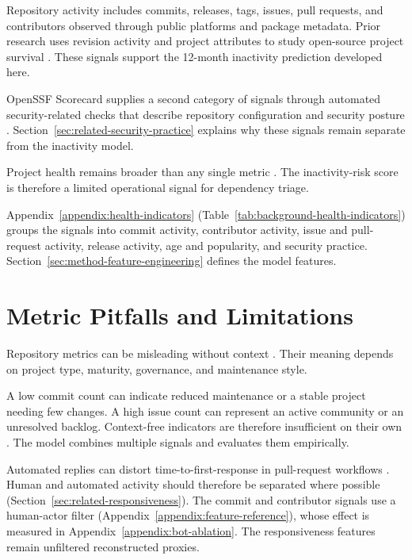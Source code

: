 Repository activity includes commits, releases, tags, issues, pull requests, and
contributors observed through public platforms and package metadata. Prior
research uses revision activity and project attributes to study open-source
project survival \cite{robinson2022survival}. These signals support the 12-month
inactivity prediction developed here.

OpenSSF Scorecard supplies a second category of signals through automated
security-related checks that describe repository configuration and security
posture \cite{zahan2023scorecard}. Section~\ref{sec:related-security-practice}
explains why these signals remain separate from the inactivity model.

Project health remains broader than any single metric
\cite{goggins2021transparent}. The inactivity-risk score is therefore a limited
operational signal for dependency triage.

Appendix~\ref{appendix:health-indicators}
(Table~\ref{tab:background-health-indicators}) groups the signals into commit
activity, contributor activity, issue and pull-request activity, release
activity, age and popularity, and security practice. Section~\ref{sec:method-feature-engineering}
defines the model features.

\section{Metric Pitfalls and Limitations}
\label{sec:background-metric-pitfalls}

Repository metrics can be misleading without context
\cite{yehudi2023contextfree}. Their meaning depends on project type, maturity,
governance, and maintenance style.

A low commit count can indicate reduced maintenance or a stable project needing
few changes. A high issue count can represent an active community or an
unresolved backlog. Context-free indicators are therefore insufficient on their
own \cite{yehudi2023contextfree,kalliamvakou2016perils}. The model combines
multiple signals and evaluates them empirically.

Automated replies can distort time-to-first-response in pull-request workflows
\cite{hasan2023firstresponse}. Human and automated activity should therefore be
separated where possible (Section~\ref{sec:related-responsiveness}). The commit
and contributor signals use a human-actor filter
(Appendix~\ref{appendix:feature-reference}), whose effect is measured in
Appendix~\ref{appendix:bot-ablation}. The responsiveness features remain
unfiltered reconstructed proxies.

